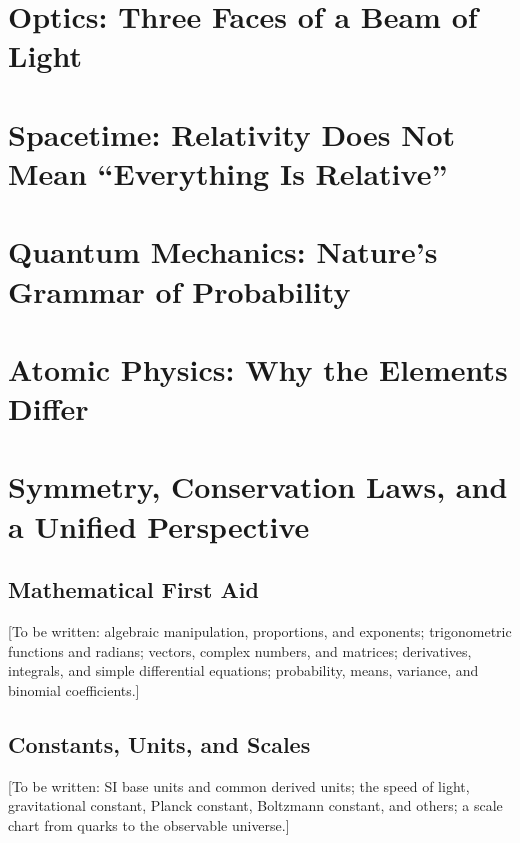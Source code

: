 \documentclass[fontset=fandol,12pt,openany]{ctexbook}
\begin{document}
\part{Optics: Three Faces of a Beam of Light}





\part{Spacetime: Relativity Does Not Mean ``Everything Is Relative''}




\part{Quantum Mechanics: Nature's Grammar of Probability}









\part{Atomic Physics: Why the Elements Differ}






\part{Symmetry, Conservation Laws, and a Unified Perspective}






\backmatter
\chapter{Mathematical First Aid}
[To be written: algebraic manipulation, proportions, and exponents; trigonometric functions and radians; vectors, complex numbers, and matrices; derivatives, integrals, and simple differential equations; probability, means, variance, and binomial coefficients.]
\chapter{Constants, Units, and Scales}
[To be written: SI base units and common derived units; the speed of light, gravitational constant, Planck constant, Boltzmann constant, and others; a scale chart from quarks to the observable universe.]
\end{document}
